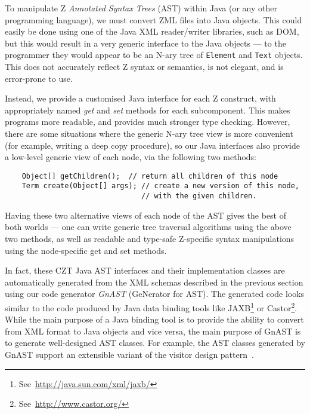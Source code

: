 \documentclass{llncs}
\begin{document}
  To manipulate Z \emph{Annotated Syntax Trees} (AST) within Java (or
  any other programming language), we must convert ZML files into Java
  objects.  This could easily be done using one of the Java XML
  reader/writer libraries, such as DOM, but this would result in a
  very generic interface to the Java objects --- to the programmer they
  would appear to be an N-ary tree of \texttt{Element} and
  \texttt{Text} objects. This does not accurately reflect Z
  syntax or semantics, is not elegant, and is error-prone to use.

  Instead, we provide a customised Java interface for each Z
  construct, with appropriately named \emph{get} and \emph{set}
  methods for each subcomponent.  This makes programs more readable,
  and provides much stronger type checking.  However, there are some
  situations where the generic N-ary tree view is more convenient
  (for example, writing a deep copy procedure), so our Java interfaces
  also provide a low-level generic view of each node, via the following
  two methods:
\begin{small}
\begin{verbatim}
    Object[] getChildren();  // return all children of this node
    Term create(Object[] args); // create a new version of this node,
                                // with the given children.
\end{verbatim}
\end{small}
  Having these two alternative views of each node of the AST gives
  the best of both worlds --- one can write generic tree traversal
  algorithms using the above two methods, as well as readable and
  type-safe Z-specific syntax manipulations using the node-specific
  get and set methods.

  In fact, these CZT Java AST interfaces and their implementation
  classes are automatically generated from the XML schemas described
  in the previous section using our code generator \emph{GnAST}
  (GeNerator for AST).  The generated code looks similar to the code
  produced by Java data binding tools like
  JAXB\footnote{See~\url{http://java.sun.com/xml/jaxb/}} or
  Castor\footnote{See~\url{http://www.castor.org/}}.
  While the main purpose of a Java binding tool is to
  provide the ability to convert from XML format to Java objects and
  vice versa, the main purpose of GnAST is to generate well-designed
  AST classes.  For example, the AST classes generated by GnAST
  support an extensible variant of the visitor design
  pattern~\cite{GamEA:95,MaiCha:01}.
\end{document}
